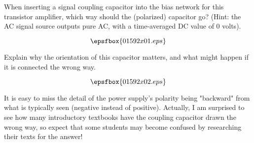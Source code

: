 

When inserting a signal coupling capacitor into the bias network for this transistor amplifier, which way should the (polarized) capacitor go?  (Hint: the AC signal source outputs pure AC, with a time-averaged DC value of 0 volts).

$$\epsfbox{01592x01.eps}$$

Explain why the orientation of this capacitor matters, and what might happen if it is connected the wrong way.







$$\epsfbox{01592x02.eps}$$







It is easy to miss the detail of the power supply's polarity being "backward" from what is typically seen (negative instead of positive).  Actually, I am surprised to see how many introductory textbooks have the coupling capacitor drawn the wrong way, so expect that some students may become confused by researching their texts for the answer!





